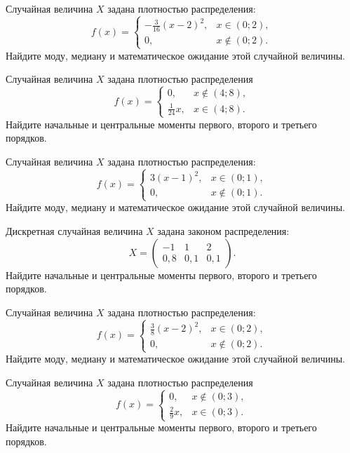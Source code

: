 \vfill

\newpage\setcounter{zad}{0}

\z Случайная величина $X$ задана плотностью распределения: $$f(x) = \begin{cases} -\frac{3}{16}(x-2)^2, & x \in (0; 2), \\ 0, & x \not\in (0; 2). \end{cases}$$ Найдите моду, медиану и математическое ожидание этой случайной величины.


\vfill

\z Случайная величина $X$ задана плотностью распределения $$f(x) = \begin{cases}0, & x\not\in(4; 8), \\ \frac{1}{24}x, & x\in(4; 8).\end{cases}$$ Найдите начальные и центральные моменты первого, второго и третьего порядков.
 

\vfill

\newpage\setcounter{zad}{0}

\z Случайная величина $X$ задана плотностью распределения: $$f(x) = \begin{cases} 3(x-1)^2, & x \in (0; 1), \\ 0, & x \not\in (0; 1). \end{cases}$$ Найдите моду, медиану и математическое ожидание этой случайной величины.


\vfill

\z Дискретная случайная величина $X$ задана законом распределения: $$ X = \left(\begin{array}{rrr}-1 & 1 & 2\\0{,}8 & 0{,}1 & 0{,}1\end{array}\right).$$ Найдите начальные и центральные моменты первого, второго и третьего порядков.
 

\vfill

\newpage\setcounter{zad}{0}

\z Случайная величина $X$ задана плотностью распределения: $$f(x) = \begin{cases} \frac{3}{8}(x-2)^2, & x \in (0; 2), \\ 0, & x \not\in (0; 2). \end{cases}$$ Найдите моду, медиану и математическое ожидание этой случайной величины.


\vfill

\z Случайная величина $X$ задана плотностью распределения $$f(x) = \begin{cases}0, & x\not\in(0; 3), \\ \frac{2}{9}x, & x\in(0; 3).\end{cases}$$ Найдите начальные и центральные моменты первого, второго и третьего порядков.
 

